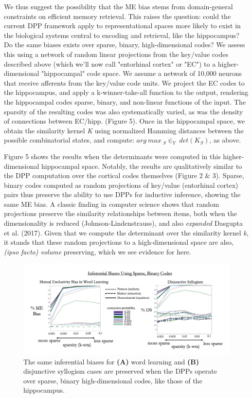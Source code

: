 \documentclass[10pt,letterpaper]{article}
\begin{document}
We thus suggest the possibility that the ME bias stems from domain-general constraints on efficient memory retrieval. This raises the question: could the current DPP framework apply to representational spaces more likely to exist in the biological systems central to encoding and retrieval, like the hippocampus? Do the same biases exists over sparse, binary, high-dimensional codes? We assess this using a network of random linear projections from the key/value codes described above (which we'll now call "entorhinal cortex" or "EC") to a higher-dimensional "hippocampal" code space. We assume a network of 10,000 neurons that receive afferents from the key/value code units. We project the EC codes to the hippocampus, and apply a k-winner-take-all function to the output, rendering the hippocampal codes sparse, binary, and non-linear functions of the input. The sparsity of the resulting codes was also systematically varied, as was the density of connections between EC/hipp. (Figure 5). Once in the hippocampal space, we obtain the similarity kernel \textit{K} using normalized Hamming distances between the possible combinatorial states, and compute: \(arg\ max \ _S\in_Y \ det(K _{S})\),    as above.


Figure 5 shows the results when the determinants were computed in this higher-dimensional hippocampal space. Notably, the results are qualitatively similar to the DPP computation over the cortical codes themselves (Figure 2 \& 3). Sparse, binary codes computed as random projections of key/value (entorhinal cortex) pairs thus preserve the ability to use DPPs for inductive inference, showing the same ME bias. A classic finding in computer science shows that random projections preserve the similarity relationships between items, both when the dimensionality is reduced (Johnson-Lindenstrauss), and also \textit{expanded} Dasgupta et al. (2017). Given that we compute the determinant over the similarity kernel \textit{k}, it stands that these random projections to a high-dimensional space are also, \textit{(ipso facto) volume} preserving, which we see evidence for here.



\begin{figure}[h]
  \centering \includegraphics[width=1\columnwidth]{figure5.png}
  \caption{The same inferential biases for \textbf{(A)} word learning and \textbf{(B)} disjunctive syllogism cases are preserved when the DPPs operate over sparse, binary high-dimensional codes, like those of the hippocampus. }
\end{figure}
\end{document}
